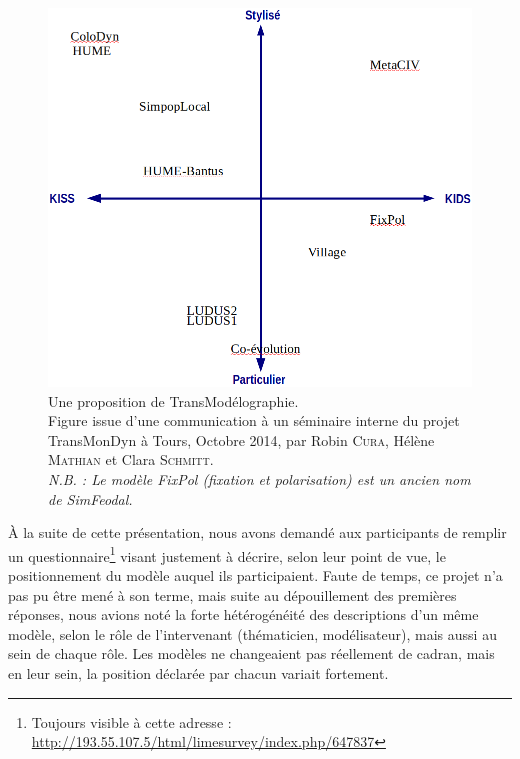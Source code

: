 \begin{figure}[H]
	\centering
	\includegraphics[width=\linewidth]{img/transmodelographie.png}
	\caption[Une proposition de \og TransModélographie\fg{}.]{Une proposition de \og TransModélographie\fg{}.\\
	Figure issue d'une communication à un séminaire interne du projet TransMonDyn à Tours, Octobre 2014, par Robin \textsc{Cura}, Hélène \textsc{Mathian} et Clara \textsc{Schmitt}.\\
	\textit{N.B. : Le modèle \og FixPol\fg{} (fixation et polarisation) est un ancien nom de SimFeodal.}}
	\label{fig:transmodelographie}
\end{figure}

À la suite de cette présentation, nous avons demandé aux participants de remplir un questionnaire\footnote{
	Toujours visible à cette adresse : \href{http://193.55.107.5/html/limesurvey/index.php/647837?lang=fr}{http://193.55.107.5/html/limesurvey/index.php/647837}
} visant justement à décrire, selon leur point de vue, le positionnement du modèle auquel ils participaient.
Faute de temps, ce projet n'a pas pu être mené à son terme, mais suite au dépouillement des premières réponses, nous avions noté la forte hétérogénéité des descriptions d'un même modèle, selon le rôle de l'intervenant (thématicien, modélisateur), mais aussi au sein de chaque rôle.
Les modèles ne changeaient pas réellement de cadran, mais en leur sein, la position déclarée par chacun variait fortement.

